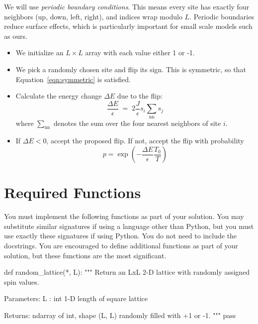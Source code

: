 \documentclass[12pt]{article}
\begin{document}
We will use \emph{periodic boundary conditions}.  This means every
site has exactly four neighbors (up, down, left, right), and indices
wrap modulo $L$.  Periodic boundaries reduce surface effects, which is
particularly important for small scale models such as ours.

\begin{itemize}

\item We initialize an $L \times L$ array with each value either 1 or -1.

\item We pick a randomly chosen site and flip its sign.  This is
  symmetric, so that Equation~\ref{eqn:symmetric} is satisfied.

\item Calculate the energy change $\Delta E$ due to the flip:
$$ \frac{\Delta E}{\epsilon} \;=\; 2 \frac{J}{\epsilon} s_i \sum_{\text{nn}} s_j $$
where $\sum_{\text{nn}}$ denotes the sum over the four nearest neighbors of site $i$.
  
\item If $\Delta E < 0$, accept the proposed flip. If not, accept the flip with probability
  $$p = \exp\left(-\frac{\Delta E}{\epsilon} \frac{T_0}{T} \right)$$

\end{itemize}





\section{Required Functions}

You must implement the following functions as part of your solution.
You may substitute similar signatures if using a language other than
Python, but you must use exactly these signatures if using Python. You
do not need to include the docstrings.  You are encouraged to define
additional functions as part of your solution, but these functions are
the most significant.

\begin{python}
def random_lattice(*, L):
    """
    Return an LxL 2-D lattice with randomly assigned spin values.

    Parameters:
      L : int 1-D   length of square lattice

    Returns:
      ndarray of int, shape (L, L) randomly filled with +1 or -1.
    """
    pass
\end{python}
\end{document}
